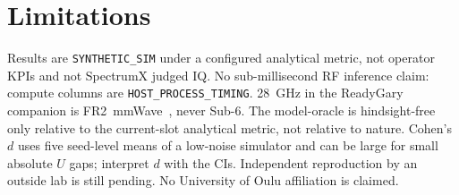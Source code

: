 \section{Limitations}
Results are \texttt{SYNTHETIC\_SIM} under a configured analytical metric, not operator KPIs and not SpectrumX judged IQ.
No sub-millisecond RF inference claim: compute columns are \texttt{HOST\_PROCESS\_TIMING}.
28~GHz in the ReadyGary companion is FR2~mmWave~\cite{3gpp_ts38101_2}, never Sub-6.
The model-oracle is hindsight-free only relative to the current-slot analytical metric, not relative to nature.
Cohen's $d$ uses five seed-level means of a low-noise simulator and can be large for small absolute $U$ gaps; interpret $d$ with the CIs.
Independent reproduction by an outside lab is still pending.
No University of Oulu affiliation is claimed.
